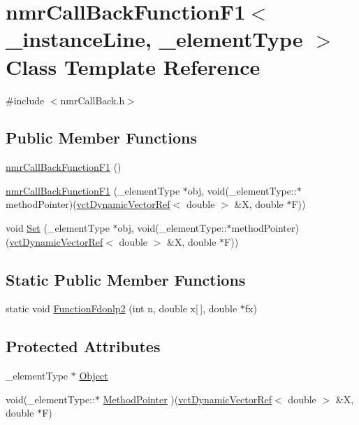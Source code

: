 \hypertarget{classnmr_call_back_function_f1}{\section{nmr\-Call\-Back\-Function\-F1$<$ \-\_\-instance\-Line, \-\_\-element\-Type $>$ Class Template Reference}
\label{classnmr_call_back_function_f1}
}


{\ttfamily \#include $<$nmr\-Call\-Back.\-h$>$}

\subsection*{Public Member Functions}
\begin{DoxyCompactItemize}
\item 
\hyperlink{classnmr_call_back_function_f1_ac4b710c1e9e0d39300dcaa57bbf64393}{nmr\-Call\-Back\-Function\-F1} ()
\item 
\hyperlink{classnmr_call_back_function_f1_ae2f443265d36a2e7f910ee18002dd43c}{nmr\-Call\-Back\-Function\-F1} (\-\_\-element\-Type $\ast$obj, void(\-\_\-element\-Type\-::$\ast$method\-Pointer)(\hyperlink{classvct_dynamic_vector_ref}{vct\-Dynamic\-Vector\-Ref}$<$ double $>$ \&X, double $\ast$F))
\item 
void \hyperlink{classnmr_call_back_function_f1_a293dd5822b1fd7c32d42a55133a180b5}{Set} (\-\_\-element\-Type $\ast$obj, void(\-\_\-element\-Type\-::$\ast$method\-Pointer)(\hyperlink{classvct_dynamic_vector_ref}{vct\-Dynamic\-Vector\-Ref}$<$ double $>$ \&X, double $\ast$F))
\end{DoxyCompactItemize}
\subsection*{Static Public Member Functions}
\begin{DoxyCompactItemize}
\item 
static void \hyperlink{classnmr_call_back_function_f1_a720235044e772004b44ae5baf496d28e}{Function\-Fdonlp2} (int n, double x\mbox{[}$\,$\mbox{]}, double $\ast$fx)
\end{DoxyCompactItemize}
\subsection*{Protected Attributes}
\begin{DoxyCompactItemize}
\item 
\-\_\-element\-Type $\ast$ \hyperlink{classnmr_call_back_function_f1_a65ebc32c3c8d280b0920dfbb27eb96d8}{Object}
\item 
void(\-\_\-element\-Type\-::$\ast$ \hyperlink{classnmr_call_back_function_f1_a849245ab1af9c95d2ffe8717de0d70e8}{Method\-Pointer} )(\hyperlink{classvct_dynamic_vector_ref}{vct\-Dynamic\-Vector\-Ref}$<$ double $>$ \&X, double $\ast$F)
\end{DoxyCompactItemize}
